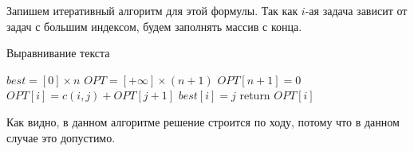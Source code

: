 Запишем итеративный алгоритм для этой формулы.
Так как $i$-ая задача зависит от задач с большим индексом, будем заполнять массив с конца.

\begin{algorithm}
	\caption{Выравнивание текста}
	\begin{algorithmic}
			\State \(best = [0] \times n\)
			\State \(OPT = [+\infty] \times (n + 1)\)
			\State $OPT[n + 1] = 0$
						\State \(OPT[i] = c(i, j) + OPT[j + 1]\)
						\State \(best[i] = j\)
					\EndIf
				\EndFor
			\EndFor
			\State return $OPT[i]$
		\EndFunction
	\end{algorithmic}
\end{algorithm}

Как видно, в данном алгоритме решение строится по ходу, потому что в данном случае это допустимо.



